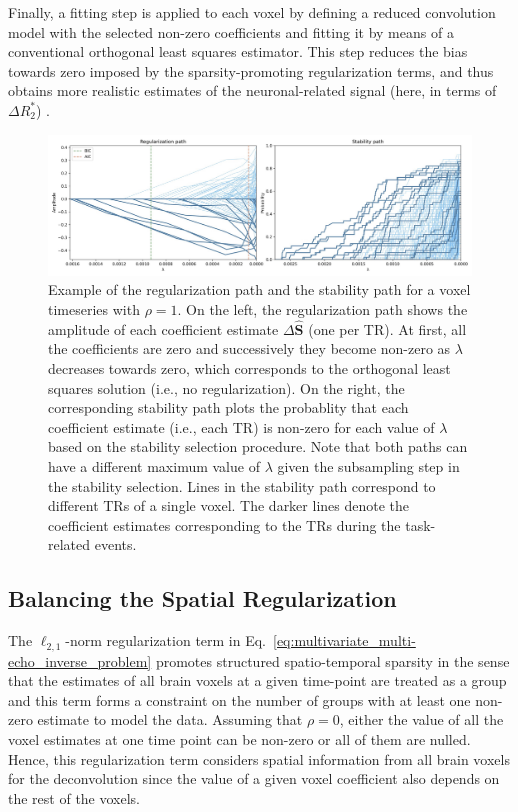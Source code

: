 Finally, a fitting step is applied to each voxel by defining a reduced
convolution model with the selected non-zero coefficients and fitting it by
means of a conventional orthogonal least squares estimator. This step reduces
the bias towards zero imposed by the sparsity-promoting regularization terms,
and thus obtains more realistic estimates of the neuronal-related signal (here,
in terms of $\Delta R_2^*$)
\citep{CaballeroGaudes2019deconvolutionalgorithmmulti}.

\begin{figure}[t!]
    \centerline{\includegraphics[width=\textwidth]{figures/multivariate/reg_and_stab_paths.jpg}}
    \caption{Example of the regularization path and the stability path for a
    voxel timeseries with $\rho=1$. On the left, the regularization path shows
    the amplitude of each coefficient estimate $\Delta \hat{\mathbf{S}}$ (one
    per TR). At first, all the coefficients are zero and successively they
    become non-zero as $\lambda$ decreases towards zero, which corresponds to
    the orthogonal least squares solution (i.e., no regularization). On the
    right, the corresponding stability path plots the probablity that each
    coefficient estimate (i.e., each TR) is non-zero for each value of $\lambda$
    based on the stability selection procedure. Note that both paths can have a
    different maximum value of $\lambda$ given the subsampling step in the
    stability selection. Lines in the stability path correspond to different TRs
    of a single voxel. The darker lines denote the coefficient estimates
    corresponding to the TRs during the task-related events.}
\label{fig:reg_and_stab_paths}
\end{figure}

\subsection{Balancing the Spatial Regularization}

The $\ell_{2,1}$-norm regularization term in
Eq.~\eqref{eq:multivariate_multi-echo_inverse_problem} promotes structured
spatio-temporal sparsity in the sense that the estimates of all brain voxels at
a given time-point are treated as a group and this term forms a constraint on
the number of groups with at least one non-zero estimate to model the data.
Assuming that $\rho=0$, either the value of all the voxel estimates at one time
point can be non-zero or all of them are nulled. Hence, this regularization term
considers spatial information from all brain voxels for the deconvolution since
the value of a given voxel coefficient also depends on the rest of the voxels. 

